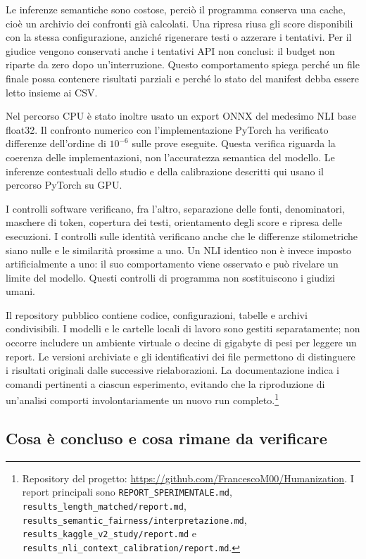 Le inferenze semantiche sono costose, perciò il programma conserva una cache, cioè un archivio dei confronti già calcolati. Una ripresa riusa gli score disponibili con la stessa configurazione, anziché rigenerare testi o azzerare i tentativi. Per il giudice vengono conservati anche i tentativi API non conclusi: il budget non riparte da zero dopo un'interruzione. Questo comportamento spiega perché un file finale possa contenere risultati parziali e perché lo stato del manifest debba essere letto insieme ai CSV.

Nel percorso CPU è stato inoltre usato un export ONNX del medesimo NLI base float32. Il confronto numerico con l'implementazione PyTorch ha verificato differenze dell'ordine di \(10^{-6}\) sulle prove eseguite. Questa verifica riguarda la coerenza delle implementazioni, non l'accuratezza semantica del modello. Le inferenze contestuali dello studio e della calibrazione descritti qui usano il percorso PyTorch su GPU.

I controlli software verificano, fra l'altro, separazione delle fonti, denominatori, maschere di token, copertura dei testi, orientamento degli score e ripresa delle esecuzioni. I controlli sulle identità verificano anche che le differenze stilometriche siano nulle e le similarità prossime a uno. Un NLI identico non è invece imposto artificialmente a uno: il suo comportamento viene osservato e può rivelare un limite del modello. Questi controlli di programma non sostituiscono i giudizi umani.

Il repository pubblico contiene codice, configurazioni, tabelle e archivi condivisibili. I modelli e le cartelle locali di lavoro sono gestiti separatamente; non occorre includere un ambiente virtuale o decine di gigabyte di pesi per leggere un report. Le versioni archiviate e gli identificativi dei file permettono di distinguere i risultati originali dalle successive rielaborazioni. La documentazione indica i comandi pertinenti a ciascun esperimento, evitando che la riproduzione di un'analisi comporti involontariamente un nuovo run completo.\footnote{Repository del progetto: \url{https://github.com/FrancescoM00/Humanization}. I report principali sono \nolinkurl{REPORT_SPERIMENTALE.md}, \nolinkurl{results_length_matched/report.md}, \nolinkurl{results_semantic_fairness/interpretazione.md}, \nolinkurl{results_kaggle_v2_study/report.md} e \nolinkurl{results_nli_context_calibration/report.md}.}

\subsection{Cosa è concluso e cosa rimane da verificare}\label{cosa-uxe8-concluso-e-cosa-rimane-da-verificare}

